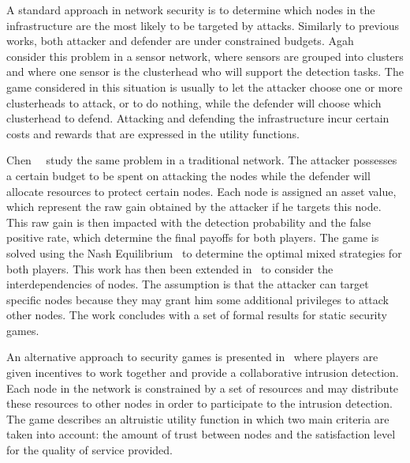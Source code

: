  A standard approach in network security is to determine which nodes in the infrastructure are the most likely to be targeted by attacks. 
 Similarly to previous works, both attacker and defender are under constrained budgets.
 Agah~\etal~\cite{agah2004} consider this problem in a sensor network, where sensors are grouped into clusters and where one sensor is the clusterhead who will support the detection tasks.
 The game considered in this situation is usually to let the attacker choose one or more clusterheads to attack, or to do nothing, while the defender will choose which clusterhead to defend.
 Attacking and defending the infrastructure incur certain costs and rewards that are expressed in the utility functions.
 
 Chen~\etal~\cite{Chen2009} study the same problem in a traditional network. The attacker possesses a certain budget to be spent on attacking the nodes while the defender will allocate resources to protect certain nodes.
 Each node is assigned an asset value, which represent the raw gain obtained by the attacker if he targets this node.
 This raw gain is then impacted with the detection probability and the false positive rate, which determine the final payoffs for both players.
 The game is solved using the Nash Equilibrium~\cite{nasheq} to determine the optimal mixed strategies for both players.
 This work has then been extended in~\cite{interdep-ismail2017} to consider the interdependencies of nodes.
 The assumption is that the attacker can target specific nodes because they may grant him some additional privileges to attack other nodes.
 The work concludes with a set of formal results for static security games.
 
 An alternative approach to security games is presented in~\cite{Zhu2009b} where players are given incentives to work together and provide a collaborative intrusion detection.
 Each node in the network is constrained by a set of resources and may distribute these resources to other nodes in order to participate to the intrusion detection.
 The game describes an altruistic utility function in which two main criteria are taken into account: the amount of trust between nodes and the satisfaction level for the quality of service provided.

